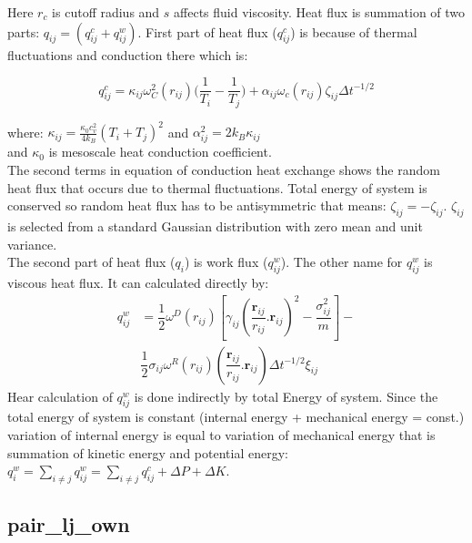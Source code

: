 Here $ r_{c} $ is cutoff radius and $ s $ affects fluid viscosity.
Heat flux is summation of two parts: $ q_{ij} =\left(q_{ij}^{c}+q_{ij}^{w}\right)$. First part of heat flux ($q_{ij}^{c}$) is because of thermal fluctuations and conduction there which is:\\
\begin{center}
	\begin{equation}\label{q_E}
	q_{ij}^{c} = \kappa _{ij} \omega ^{2}_{C}(r_{ij}) \Big( \frac{1}{T_{i}}-\frac{1}{T_{j}} \Big) + \alpha _{ij} \omega _{c}(r_{ij}) \zeta _{ij} \Delta t ^{-1/2} 
	\end{equation}
\end{center}
where:
$ \kappa _{ij} = \frac{\kappa _{0} c_{v} ^{2}}{4k_{B}}(T_{i}+T_{j})^{2} $ and $ \alpha _{ij} ^{2} = 2k_{B}\kappa _{ij} $\\
and $ \kappa _{0} $ is mesoscale heat conduction coefficient.\\
The second terms in equation of conduction heat exchange shows the random heat flux that occurs due to thermal fluctuations. Total energy of system is conserved so random heat flux has to be antisymmetric that means: $ \zeta _{ij} = -\zeta _{ij} $. $ \zeta _{ij} $  is selected from a standard Gaussian distribution with zero mean and unit variance.  \\ 
The second part of heat flux ($q_{i}$) is work flux ($q^{w}_{ij}$). The other name for $ q^{w}_{ij} $ is viscous heat flux. It can calculated directly by:
\begin{equation}
\begin{aligned}
q^{w}_{ij} &= \dfrac{1}{2}\omega^{D}(r_{ij})\left[\gamma _{ij} (\dfrac{\textbf{r}_{ij}}{r_{ij}}.\textbf{r}_{ij})^{2}-\dfrac{\sigma ^{2}_{ij}}{m}\right]-\\
&\dfrac{1}{2}\sigma_{ij} \omega^{R}(r_{ij})(\dfrac{\textbf{r}_{ij}}{r_{ij}}.\textbf{r}_{ij})\Delta t^{-1/2} \xi _{ij} 
\end{aligned}
\end{equation}
Hear calculation of $ q_{ij}^{w} $ is done indirectly by total Energy of system. Since the total energy of system is constant (internal energy + mechanical energy = const.)  variation of internal energy is equal to variation of mechanical energy that is summation of kinetic energy and potential energy: $ q^{w}_{i} = \sum\limits_{i\ne j} q^{w}_{ij} = \sum\limits_{i \ne j}q^{c}_{ij}+ \Delta P +\Delta K $.\\ 

\subsection{pair\_lj\_own}

